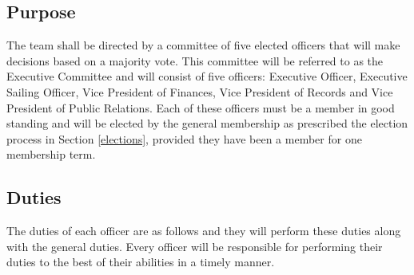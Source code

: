 \documentclass[12pt,titlepage,letter]{article}
\begin{document}
\subsection{Purpose}
The team shall be directed by a committee of five elected officers that will make decisions based on a majority vote. This committee will be referred to as the Executive Committee and will consist of five officers: Executive Officer, Executive Sailing Officer, Vice President of Finances, Vice President of Records and Vice President of Public Relations. Each of these officers must be a member in good standing and will be elected by the general membership as prescribed the election process in Section \ref{elections}, provided they have been a member for one membership term.
\subsection{Duties}
The duties of each officer are as follows and they will perform these duties along with the general duties. Every officer will be responsible for performing their duties to the best of their abilities in a timely manner.
\end{document}
